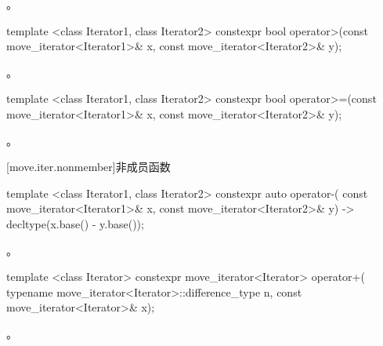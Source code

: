 \begin{itemdescr}
\pnum
\returns {}。
\end{itemdescr}

%
%
\begin{itemdecl}
template <class Iterator1, class Iterator2>
constexpr bool operator>(const move_iterator<Iterator1>& x, const move_iterator<Iterator2>& y);
\end{itemdecl}

\begin{itemdescr}
\pnum
\returns {}。
\end{itemdescr}

%
%
\begin{itemdecl}
template <class Iterator1, class Iterator2>
constexpr bool operator>=(const move_iterator<Iterator1>& x, const move_iterator<Iterator2>& y);
\end{itemdecl}

\begin{itemdescr}
\pnum
\returns {}。
\end{itemdescr}

[move.iter.nonmember]{非成员函数}

%
%
\begin{itemdecl}
template <class Iterator1, class Iterator2>
    constexpr auto operator-(
    const move_iterator<Iterator1>& x,
    const move_iterator<Iterator2>& y) -> decltype(x.base() - y.base());
\end{itemdecl}

\begin{itemdescr}
\pnum
\returns {}。
\end{itemdescr}

%
%
\begin{itemdecl}
template <class Iterator>
  constexpr move_iterator<Iterator> operator+(
    typename move_iterator<Iterator>::difference_type n, const move_iterator<Iterator>& x);
\end{itemdecl}

\begin{itemdescr}
\pnum
\returns {}。
\end{itemdescr}

